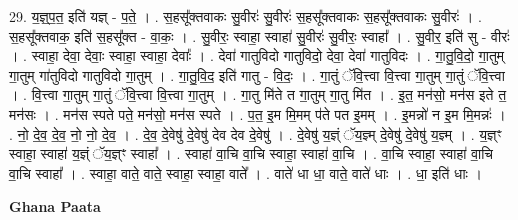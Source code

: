 \documentclass[17pt]{extarticle}
\begin{document}
29. य॒ज्ञ्॒प॒त॒ इति॑ यज्ञ् - प॒ते॒ । . स॒हसू᳚क्तवाकः सु॒वीरः॑ सु॒वीरः॑ स॒हसू᳚क्तवाकः स॒हसू᳚क्तवाकः सु॒वीरः॑ । . स॒हसू᳚क्तवाक॒ इति॑ स॒हसू᳚क्त - वा॒कः॒ । . सु॒वीरः॒ स्वाहा॒ स्वाहा॑ सु॒वीरः॑ सु॒वीरः॒ स्वाहा᳚ । . सु॒वीर॒ इति॑ सु - वीरः॑ । . स्वाहा॒ देवा॒ देवाः॒ स्वाहा॒ स्वाहा॒ देवाः᳚ । . देवा॑ गातुविदो गातुविदो॒ देवा॒ देवा॑ गातुविदः । . गा॒तु॒वि॒दो॒ गा॒तुम् गा॒तुम् गा॑तुविदो गातुविदो गा॒तुम् । . गा॒तु॒वि॒द॒ इति॑ गातु - वि॒दः॒ । . गा॒तुं ॅवि॒त्त्वा वि॒त्त्वा गा॒तुम् गा॒तुं ॅवि॒त्त्वा । . वि॒त्त्वा गा॒तुम् गा॒तुं ॅवि॒त्त्वा वि॒त्त्वा गा॒तुम् । . गा॒तु मि॑ते त गा॒तुम् गा॒तु मि॑त । . इ॒त॒ मन॑सो॒ मन॑स इते त॒ मन॑सः । . मन॑स स्पते पते॒ मन॑सो॒ मन॑स स्पते । . प॒त॒ इ॒म मि॒मम् प॑ते पत इ॒मम् । . इ॒मन्नो॑ न इ॒म मि॒मन्नः॑ । . नो॒ दे॒व॒ दे॒व॒ नो॒ नो॒ दे॒व॒ । . दे॒व॒ दे॒वेषु॑ दे॒वेषु॑ देव देव दे॒वेषु॑ । . दे॒वेषु॑ य॒ज्ञ्ं ॅय॒ज्ञ्म् दे॒वेषु॑ दे॒वेषु॑ य॒ज्ञ्म् । . य॒ज्ञ्ꣳ स्वाहा॒ स्वाहा॑ य॒ज्ञ्ं ॅय॒ज्ञ्ꣳ स्वाहा᳚ । . स्वाहा॑ वा॒चि वा॒चि स्वाहा॒ स्वाहा॑ वा॒चि । . वा॒चि स्वाहा॒ स्वाहा॑ वा॒चि वा॒चि स्वाहा᳚ । . स्वाहा॒ वाते॒ वाते॒ स्वाहा॒ स्वाहा॒ वाते᳚ । . वाते॑ धा धा॒ वाते॒ वाते॑ धाः । . धा॒ इति॑ धाः । \newline

\textbf{Ghana Paata } \newline
\end{document}
